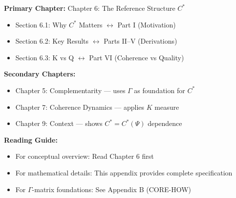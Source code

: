 
\begin{tcolorbox}[colback=purple!5!white, colframe=purple!75!black,
    title=\textbf{Chapter Linkages}]

\textbf{Primary Chapter:} Chapter 6: The Reference Structure $C^*$
\begin{itemize}[nosep]
    \item Section 6.1: Why $C^*$ Matters $\leftrightarrow$ Part I (Motivation)
    \item Section 6.2: Key Results $\leftrightarrow$ Parts II--V (Derivations)
    \item Section 6.3: K vs Q $\leftrightarrow$ Part VI (Coherence vs Quality)
\end{itemize}

\textbf{Secondary Chapters:}
\begin{itemize}[nosep]
    \item Chapter 5: Complementarity --- uses $\Gamma$ as foundation for $C^*$
    \item Chapter 7: Coherence Dynamics --- applies $K$ measure
    \item Chapter 9: Context --- shows $C^* = C^*(\Psi)$ dependence
\end{itemize}

\textbf{Reading Guide:}
\begin{itemize}[nosep]
    \item For conceptual overview: Read Chapter 6 first
    \item For mathematical details: This appendix provides complete specification
    \item For $\Gamma$-matrix foundations: See Appendix B (CORE-HOW)
\end{itemize}

\end{tcolorbox}


